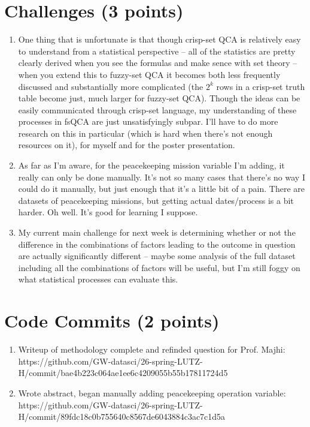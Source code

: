 \documentclass[10pt]{article}
\begin{document}
\section*{Challenges (3 points)}
\begin{enumerate}
	\item One thing that is unfortunate is that though crisp-set QCA is relatively easy to understand from a statistical perspective -- all of the statistics are pretty clearly derived when you see the formulas and make sence with set theory -- when you extend this to fuzzy-set QCA it becomes both less frequently discussed and substantially more complicated (the $2^k$ rows in a crisp-set truth table become just, much larger for fuzzy-set QCA). Though the ideas can be easily communicated through crisp-set language, my understanding of these processes in fsQCA are just unsatisfyingly subpar. I'll have to do more research on this in particular (which is hard when there's not enough resources on it), for myself and for the poster presentation.
	\item As far as I'm aware, for the peacekeeping mission variable I'm adding, it really can only be done manually. It's not so many cases that there's no way I could do it manually, but just enough that it's a little bit of a pain. There are datasets of peacekeeping missions, but getting actual dates/process is a bit harder. Oh well. It's good for learning I suppose.
	\item My current main challenge for next week is determining whether or not the difference in the combinations of factors leading to the outcome in question are actually significantly different -- maybe some analysis of the full dataset including all the combinations of factors will be useful, but I'm still foggy on what statistical processes can evaluate this.
\end{enumerate}

\section*{Code Commits (2 points)}
\begin{enumerate}
	\item Writeup of methodology complete and refinded question for Prof. Majhi:\\ https://github.com/GW-datasci/26-spring-LUTZ-H/commit/bae4b223c064ae1ee6c4209055b55b17811724d5
	\item Wrote abstract, began manually adding peacekeeping operation variable:\\ https://github.com/GW-datasci/26-spring-LUTZ-H/commit/89fdc18c0b755640c8567de6043884c3ac7c1d5a 
\end{enumerate}

\clearpage


\end{document}
